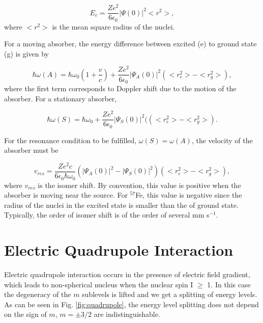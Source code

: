 \documentclass[a4paper]{report}
\numberwithin{equation}{section}
\begin{document}
\begin{equation}
		E_{c} = \frac{Z e^2}{6 \epsilon_{0}} \left| \Psi(0) \right|^2 <r^2>,
\end{equation}
where $<r^2>$ is the mean square radius of the nuclei. 

For a moving absorber, the energy difference between excited (e) to ground state (g) is given by

\begin{equation}
		\hbar \omega (A) = \hbar \omega _{0} \left( 1 + \frac{v}{c} \right) + \frac{Z e^2}{6 \epsilon_{0}} \left| \Psi_{A}(0) \right| ^2 (<r_{e}^2> - <r_{g}^2> ),
\end{equation}
where the first term corresponds to Doppler shift due to the motion of the absorber. For a stationary absorber, 

\begin{equation}
		\hbar \omega (S) = \hbar \omega _{0} + \frac{Z e^2}{6 \epsilon_{0}} \left| \Psi_{S} (0) \right| ^2 ((<r_{e}^2> - <r_{g}^2> ).
\end{equation}

For the resonance condition to be fulfilled, $\omega (S) = \omega (A)$, the velocity of the absorber must be

\begin{equation}
		v_{res} = \frac{Z e^2 c}{6 \epsilon_{0} \hbar \omega _{0}} \left( \left| \Psi_{A} (0) \right|^2 - \left| \Psi_{S} (0) \right| ^2 \right) \left( <r_{e}^2> - < r_{g}^2 > \right), 
\end{equation}
where $v_{res}$ is the isomer shift. By convention, this value is positive when the absorber is moving near the source. For $^{57}$Fe, this value is negative since the radius of the nuclei in the excited state is smaller than the of ground state. Typically, the order of isomer shift is of the order of several mm s$^{-1}$. 

\section{Electric Quadrupole Interaction}

Electric quadrupole interaction occurs in the presence of electric field gradient, which leads to non-spherical nucleus when the nuclear spin I $\geq$ 1. In this case the degeneracy of the $m$ sublevels is lifted and we get a splitting of energy levels. As can be seen in Fig. \ref{fig:quadrupole}, the energy level splitting does not depend on the sign of $m$, $m = \pm 3 / 2$ are indistinguishable.    
\end{document}
